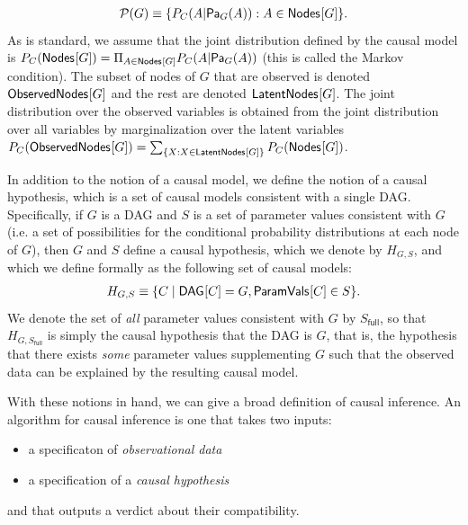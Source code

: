 \begin{align}
\mathcal{P}(G) \equiv \{\pdf[C]{A|\Pa[G]{A}}: A \in \SmallNamedFunction{Nodes}{G}\}.
\end{align}
As is standard, we assume that the joint distribution defined by the causal model is $\pdf[C]{\SmallNamedFunction{Nodes}{G}} = \Pi_{A\in \SmallNamedFunction{Nodes}{G}} \pdf[C]{A|\Pa[G]{A}}$ (this is called the Markov condition).  The subset of nodes of $G$ that are observed is denoted $\SmallNamedFunction{ObservedNodes}{G}$ and the rest are denoted $\SmallNamedFunction{LatentNodes}{G}$. 
The joint distribution over the observed variables is obtained from the joint distribution over all variables by marginalization over the latent variables $\pdf[C]{\SmallNamedFunction{ObservedNodes}{G}} =  \sum_{\{X :X \in\SmallNamedFunction{LatentNodes}{G}\}} \pdf[C]{\SmallNamedFunction{Nodes}{G}}$.

In addition to the notion of a causal model, we define the notion of a causal hypothesis, which is a set of causal models consistent with a single DAG. Specifically, if $G$ is a DAG and $S$ is a set of parameter values  consistent with $G$ (i.e. a set of possibilities for the conditional probability distributions at each node of $G$), then $G$ and $S$ define a causal hypothesis, which we denote by $H_{G,S}$, and which we define formally as the following set of causal models:
\begin{align}
H_{G,S} \equiv \{ C \mid \SmallNamedFunction{DAG}{C}=G, \SmallNamedFunction{ParamVals}{C} \in S\}.
\end{align}
We denote  the set of {\em all} parameter values consistent with $G$ by $S_{\textsf{full}}$, so that $H_{G,{S_{\textsf{full}}}}$ is simply the causal hypothesis that the DAG is $G$, that is, the hypothesis that there exists {\em some} parameter values supplementing $G$ such that the observed data can be explained by the resulting causal model. 


With these notions in hand, we can give a broad definition of causal inference.  An algorithm for causal inference is one that takes two inputs:
\begin{itemize}
\item a specificaton of {\em observational data}
\item a specification of a {\em causal hypothesis}
\end{itemize}
and that outputs a verdict about their compatibility.

